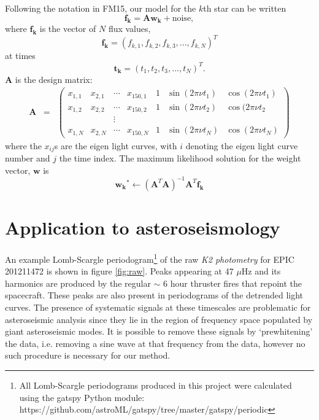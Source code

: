 \documentclass[useAMS, usenatbib]{aastex}
\begin{document}
Following the notation in FM15, our model for the $k$th star can be written
\begin{equation}
	\mathbf{f_k} = \mathbf{A}\mathbf{w_k} + \mathrm{noise},
\end{equation}
where $\mathbf{f_k}$ is the vector of $N$ flux values,
\begin{equation}
	\mathbf{f_k} = (f_{k,1}, f_{k,2}, f_{k,3}, ..., f_{k,N})^T
\end{equation}
at times
\begin{equation}
	\mathbf{t_k} = (t_1, t_2, t_3, ..., t_N)^T.
\end{equation}
$\mathbf{A}$ is the design matrix:
\begin{eqnarray}
	\mathbf{A} &=& \left (\begin{array}{ccccccc}
	x_{1,1} & x_{2,1} & \cdots & x_{150,1} & 1 & \sin(2\pi\nu t_1) & \cos(2\pi\nu t_1) \\
	x_{1,2} & x_{2,2} & \cdots & x_{150,2} & 1 & \sin(2\pi\nu t_2) & \cos(2\pi\nu t_2\\
    && \vdots &&&\\
	x_{1,N} & x_{2,N} & \cdots & x_{150,N} & 1 & \sin(2\pi\nu t_N) & \cos(2\pi\nu t_N)
\end{array}\right )
\end{eqnarray}
where the $x_{ij}$s are the eigen light curves, with $i$ denoting the eigen
light curve number and $j$ the time index.
The maximum likelihood solution for the weight vector, $\mathbf{w}$ is
\begin{equation}
	\mathbf{w_k}^* \gets (\mathbf{A}^T\mathbf{A})^{-1}\mathbf{A}^T\mathbf{f_k} \end{equation}

\section{Application to asteroseismology}

An example Lomb-Scargle periodogram\footnote{All Lomb-Scargle periodograms
produced in this project were calculated using the gatspy Python module:
https://github.com/astroML/gatspy/tree/master/gatspy/periodic}
of the raw {\it K2 photometry} for EPIC 201211472 is shown in figure
\ref{fig:raw}.
Peaks appearing at 47 $\mu$Hz and its harmonics are produced by the regular
$\sim$ 6 hour thruster fires that repoint the spacecraft.
These peaks are also present in periodograms of the \citet{Vanderburg2014}
detrended light curves.
The presence of systematic signals at these timescales are problematic for
asteroseismic analysis since they lie in the region of frequency space
populated by giant asteroseismic modes.
It is possible to remove these signals by `prewhitening' the data, i.e.
removing a sine wave at that frequency from the data, however no such
procedure is necessary for our method.
\end{document}
